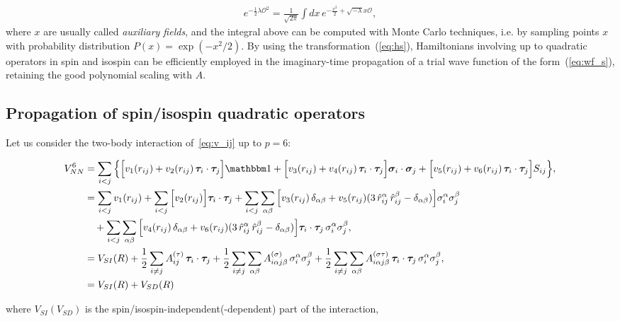 \documentclass[aps,prc,twocolumn,superscriptaddress,floatfix]{revtex4-1}
\begin{document}
\begin{align}
e^{-\frac{1}{2}\lambda \mathcal O^2}=\frac{1}{\sqrt{2\pi}}\int dx\, e^{-\frac{x^2}{2}+\sqrt{-\lambda}x\mathcal O} ,
\label{eq:hs}
\end{align}
where $x$ are usually called \emph{auxiliary fields}, and the integral above can
be computed with Monte Carlo techniques, i.e. by sampling points $x$ with  
probability distribution $P(x)=\exp(-x^2/2)$. By using the transformation~(\ref{eq:hs}),
Hamiltonians involving up to quadratic operators in spin and isospin can be efficiently
employed in the imaginary-time propagation of a trial wave function of the form~(\ref{eq:wf_s}),
retaining the good polynomial scaling with $A$.

\subsection{Propagation of spin/isospin quadratic operators}
\label{sec:p2}
Let us consider the two-body interaction of~\cref{eq:v_ij} up to $p=6$:
\begin{widetext}
\begin{align}
V_{NN}^6&=\sum_{i<j}\Big\{	
 \Big[v_1(r_{ij})+v_2(r_{ij})\,\bm\tau_i\cdot\bm\tau_j\Big]\mathbbm1
+\Big[v_3(r_{ij})+v_4(r_{ij})\,\bm\tau_i\cdot\bm\tau_j\Big]\bm\sigma_i\cdot\bm\sigma_j
+\Big[v_5(r_{ij})+v_6(r_{ij})\,\bm\tau_i\cdot\bm\tau_j\Big]S_{ij}\Big\} , \nonumber \\
&=\sum_{i<j}v_1(r_{ij})+\sum_{i<j}\Big[v_2(r_{ij})\Big]\bm\tau_i\cdot\bm\tau_j
+\sum_{i<j}\sum_{\alpha\beta}\Big[v_3(r_{ij})\,\delta_{\alpha\beta}
+v_5(r_{ij})(3\,\hat{r}_{ij}^\alpha\,\hat{r}_{ij}^\beta-\delta_{\alpha\beta})\Big]\sigma_i^\alpha\sigma_j^\beta \nonumber \\ 
&\quad+\sum_{i<j}\sum_{\alpha\beta}\Big[v_4(r_{ij})\,\delta_{\alpha\beta}
+v_6(r_{ij})(3\,\hat{r}_{ij}^\alpha\,\hat{r}_{ij}^\beta-\delta_{\alpha\beta})\Big]\bm\tau_i\cdot\bm\tau_j\,\sigma_i^\alpha\sigma_j^\beta , \nonumber \\
&=V_{SI}(R)+{1\over2}\sum_{i\ne j}A^{(\tau)}_{ij}\,\bm\tau_i\cdot\bm\tau_j
+{1\over2}\sum_{i\ne j}\sum_{\alpha\beta}A^{(\sigma)}_{i\alpha j\beta}\,\sigma_i^{\alpha}\sigma_j^{\beta}
+{1\over2}\sum_{i\ne j}\sum_{\alpha\beta}A^{(\sigma\tau)}_{i\alpha j\beta} \,\bm\tau_i\cdot\bm\tau_j\,\sigma_i^{\alpha}\sigma_j^{\beta} , \nonumber \\
&=V_{SI}(R)+V_{SD}(R) \, \label{eq:v_si+sd}
\end{align}
\end{widetext}
where $V_{SI}(V_{SD})$ is the spin/isospin-independent(-dependent) part of the interaction, 
\end{document}
